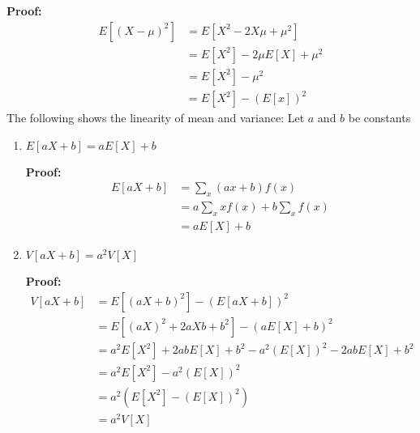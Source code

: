 \documentclass[12pt, titlepage, oneside]{article}
\renewcommand{\b}[1]{\textbf{#1}}
\begin{document}
    \b{Proof:}
    \begin{align*}
      E[(X - \mu)^2] &= E[X^2 - 2X\mu + \mu^2]\\
                     &= E[X^2] - 2\mu E[X] + \mu^2\\
                     &= E[X^2] - \mu^2\\
                     &= E[X^2] - (E[x])^2
     \end{align*}
     The following shows the linearity of mean and variance: Let $a$ and $b$ be constants
    \begin{enumerate}
      \item $E[aX + b] = aE[X] +b$

      \b{Proof:}
      \begin{align*}
        E[aX+b] &= \sum_x (ax+b) f(x) \\
                &= a\sum_x xf(x) + b \sum_x f(x)\\
                &= aE[X] + b
      \end{align*}
      \item $V[aX+b] = a^2 V[X]$

      \b{Proof:}
      \begin{align*}
        V[aX+b] &= E[(aX+b)^2]- (E[aX+b])^2\\
                &= E[(aX)^2 + 2 aXb + b^2] - (aE[X] + b)^2\\
                &= a^2E[X^2] + 2ab E[X] + b^2 - a^2(E[X])^2 - 2ab E[X] + b^2\\
                &= a^2E[X^2] - a^2(E[X])^2\\
                &= a^2(E[X^2] - (E[X])^2)\\
                &= a^2V[X]
        \end{align*}
      \end{enumerate}
    
\end{document}
